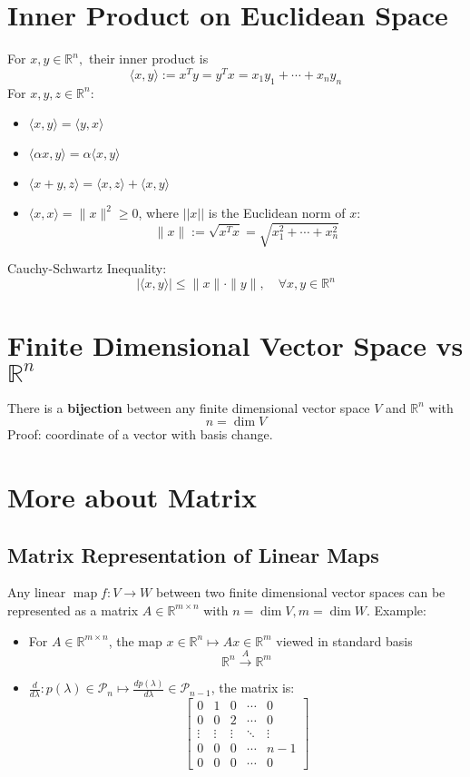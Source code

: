 \documentclass[10pt,a4paper,oneside]{article}
\begin{document}
\section{Inner Product on Euclidean Space}
For $x, y \in \mathbb{R}^{n},$ their inner product is
\[
\langle x, y\rangle := x^{T} y = y^T x=x_{1} y_{1}+\cdots+x_{n} y_{n}
\]
For $x, y, z \in \mathbb{R}^{n}$:
\begin{itemize}
\item $\langle x, y\rangle=\langle y, x\rangle$
\item $\langle\alpha x, y\rangle=\alpha\langle x, y\rangle$
\item $\langle x+y, z\rangle=\langle x, z\rangle+\langle x, y\rangle$
\item $\langle x, x\rangle=\|x\|^{2} \geq 0$, where $||x||$ is the Euclidean norm of $x$:
\[
\|x\| :=\sqrt{x^{T} x}=\sqrt{x_{1}^{2}+\cdots+x_{n}^{2}}
\]
\end{itemize}
Cauchy-Schwartz Inequality:
\[
|\langle x, y\rangle| \leq\|x\| \cdot\|y\|, \quad \forall x, y \in \mathbb{R}^{n}
\]

\section{Finite Dimensional Vector Space vs $\mathbb{R}^n$}
There is a \textbf{bijection} between any finite dimensional vector space $V$ and $\mathbb{R}^n$ with 
\[
n=\dim V
\]
Proof: coordinate of a vector with basis change.

\section{More about Matrix}
\subsection{Matrix Representation of Linear Maps}
Any linear $\operatorname{map} f : V \rightarrow W$ between two finite dimensional vector spaces can be represented as a matrix $A\in\mathbb{R}^{m\times n}$ with $n=\dim V, m=\dim W$. Example:
\begin{itemize}
\item For $A\in\mathbb{R}^{m\times n}$, the map $x \in \mathbb{R}^{n} \mapsto A x \in \mathbb{R}^{m}$ viewed in standard basis
\[
\mathbb{R}^{n} \stackrel{A}{\longrightarrow} \mathbb{R}^{m}
\]
\item $\frac{d}{d \lambda} : p(\lambda) \in \mathcal{P}_{n} \mapsto \frac{d p(\lambda)}{d \lambda} \in \mathcal{P}_{n-1}$, the matrix is:
\[
\begin{bmatrix}
0 & 1 & 0 & \cdots & 0 \\ 
0 & 0 & 2 & \cdots & 0 \\ 
\vdots & \vdots & \vdots &\ddots & \vdots \\ 
0 & 0 & 0 & \cdots & n-1 \\ 
0 & 0 & 0 & \cdots & 0
\end{bmatrix} 
\]
\end{itemize}
\end{document}
